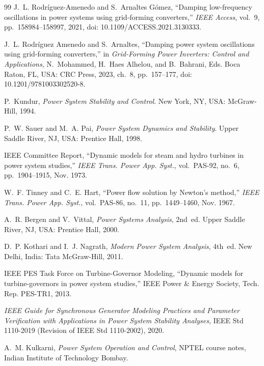 \documentclass[11pt,a4paper]{article}
\numberwithin{equation}{section}
\begin{document}
\newpage
\begin{thebibliography}{99}
J.~L. Rodr\'iguez-Amenedo and S.~Arnaltes G\'omez, ``Damping low-frequency oscillations in power systems using grid-forming converters,'' \emph{IEEE Access}, vol.~9, pp.~158984--158997, 2021, doi: 10.1109/ACCESS.2021.3130333.

J.~L. Rodr\'iguez Amenedo and S.~Arnaltes, ``Damping power system oscillations using grid-forming converters,'' in \emph{Grid-Forming Power Inverters: Control and Applications}, N.~Mohammed, H.~Haes Alhelou, and B.~Bahrani, Eds. Boca Raton, FL, USA: CRC Press, 2023, ch.~8, pp.~157--177, doi: 10.1201/9781003302520-8.

P.~Kundur, \emph{Power System Stability and Control}. New York, NY, USA: McGraw-Hill, 1994.

P.~W. Sauer and M.~A. Pai, \emph{Power System Dynamics and Stability}. Upper Saddle River, NJ, USA: Prentice Hall, 1998.

IEEE Committee Report, ``Dynamic models for steam and hydro turbines in power system studies,'' \emph{IEEE Trans. Power App. Syst.}, vol.~PAS-92, no.~6, pp.~1904--1915, Nov. 1973.

W.~F. Tinney and C.~E. Hart, ``Power flow solution by Newton's method,'' \emph{IEEE Trans. Power App. Syst.}, vol.~PAS-86, no.~11, pp.~1449--1460, Nov. 1967.

A.~R. Bergen and V.~Vittal, \emph{Power Systems Analysis}, 2nd~ed. Upper Saddle River, NJ, USA: Prentice Hall, 2000.

D.~P. Kothari and I.~J. Nagrath, \emph{Modern Power System Analysis}, 4th~ed. New Delhi, India: Tata McGraw-Hill, 2011.

IEEE PES Task Force on Turbine-Governor Modeling, ``Dynamic models for turbine-governors in power system studies,'' IEEE Power \& Energy Society, Tech. Rep. PES-TR1, 2013.

\emph{IEEE Guide for Synchronous Generator Modeling Practices and Parameter Verification with Applications in Power System Stability Analyses}, IEEE Std 1110-2019 (Revision of IEEE Std 1110-2002), 2020.

A.~M. Kulkarni, \emph{Power System Operation and Control}, NPTEL course notes, Indian Institute of Technology Bombay.
\end{thebibliography}
\end{document}
